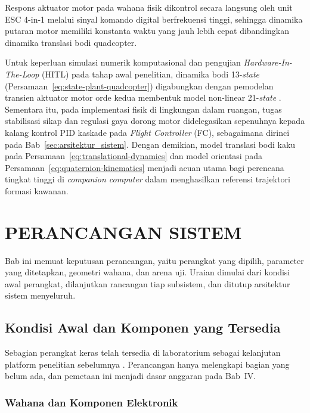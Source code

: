 \documentclass[12pt,a4paper]{report}
\begin{document}
Respons aktuator motor pada wahana fisik dikontrol secara langsung oleh unit ESC 4-in-1 melalui sinyal komando digital berfrekuensi tinggi, sehingga dinamika putaran motor memiliki konstanta waktu yang jauh lebih cepat dibandingkan dinamika translasi bodi quadcopter. 

Untuk keperluan simulasi numerik komputasional dan pengujian \textit{Hardware-In-The-Loop} (HITL) pada tahap awal penelitian, dinamika bodi 13-\textit{state} (Persamaan~\ref{eq:state-plant-quadcopter}) digabungkan dengan pemodelan transien aktuator motor orde kedua membentuk model non-linear 21-\textit{state} \cite{johnBobzwikQuadcopter_SimCon2025, kaneDynamicsTheoryApplications1985}. Sementara itu, pada implementasi fisik di lingkungan dalam ruangan, tugas stabilisasi sikap dan regulasi gaya dorong motor didelegasikan sepenuhnya kepada kalang kontrol PID kaskade pada \textit{Flight Controller} (FC), sebagaimana dirinci pada Bab~\ref{sec:arsitektur_sistem}. Dengan demikian, model translasi bodi kaku pada Persamaan~\ref{eq:translational-dynamics} dan model orientasi pada Persamaan~\ref{eq:quaternion-kinematics} menjadi acuan utama bagi perencana tingkat tinggi di \textit{companion computer} dalam menghasilkan referensi trajektori formasi kawanan.


\chapter{PERANCANGAN SISTEM}

Bab ini memuat keputusan perancangan, yaitu perangkat yang dipilih, parameter yang ditetapkan, geometri wahana, dan arena uji. Uraian dimulai dari kondisi awal perangkat, dilanjutkan rancangan tiap subsistem, dan ditutup arsitektur sistem menyeluruh.

\section{Kondisi Awal dan Komponen yang Tersedia}
\label{sec:kondisi_awal}

Sebagian perangkat keras telah tersedia di laboratorium sebagai kelanjutan platform penelitian sebelumnya \cite{argilianaPengembanganSistemKontrol2025}. Perancangan hanya melengkapi bagian yang belum ada, dan pemetaan ini menjadi dasar anggaran pada Bab~IV.

\subsection{Wahana dan Komponen Elektronik}
\end{document}
